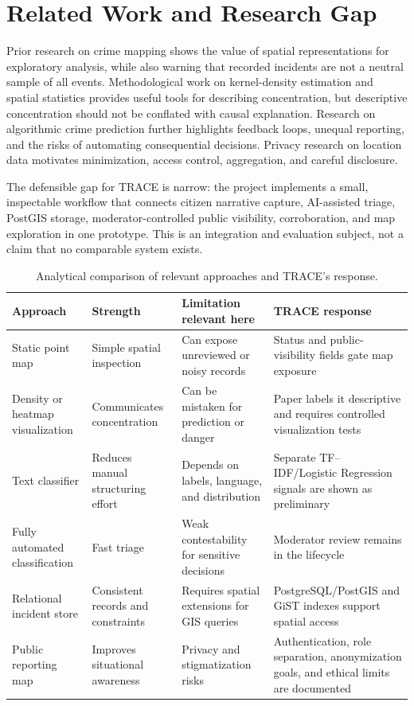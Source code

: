 \documentclass[11pt]{article}
\begin{document}
\section{Related Work and Research Gap}
\label{sec:related}

Prior research on crime mapping shows the value of spatial representations
for exploratory analysis, while also warning that recorded incidents are
not a neutral sample of all events. Methodological work on kernel-density
estimation and spatial statistics provides useful tools for describing
concentration, but descriptive concentration should not be conflated with
causal explanation. Research on algorithmic crime prediction further
highlights feedback loops, unequal reporting, and the risks of automating
consequential decisions. Privacy research on location data motivates
minimization, access control, aggregation, and careful disclosure.

The defensible gap for TRACE is narrow: the project implements a small,
inspectable workflow that connects citizen narrative capture, AI-assisted
triage, PostGIS storage, moderator-controlled public visibility,
corroboration, and map exploration in one prototype. This is an integration
and evaluation subject, not a claim that no comparable system exists.

\begin{table}[H]
\centering
\caption{Analytical comparison of relevant approaches and TRACE's response.}
\label{tab:gap}
\small
\begin{tabularx}{\textwidth}{p{}p{}p{}X}
\toprule
\textbf{Approach} & \textbf{Strength} & \textbf{Limitation relevant here} & \textbf{TRACE response}\\
\midrule
Static point map & Simple spatial inspection & Can expose unreviewed or noisy records & Status and public-visibility fields gate map exposure\\
Density or heatmap visualization & Communicates concentration & Can be mistaken for prediction or danger & Paper labels it descriptive and requires controlled visualization tests\\
Text classifier & Reduces manual structuring effort & Depends on labels, language, and distribution & Separate TF--IDF/Logistic Regression signals are shown as preliminary\\
Fully automated classification & Fast triage & Weak contestability for sensitive decisions & Moderator review remains in the lifecycle\\
Relational incident store & Consistent records and constraints & Requires spatial extensions for GIS queries & PostgreSQL/PostGIS and GiST indexes support spatial access\\
Public reporting map & Improves situational awareness & Privacy and stigmatization risks & Authentication, role separation, anonymization goals, and ethical limits are documented\\
\bottomrule
\end{tabularx}
\end{table}
\end{document}
